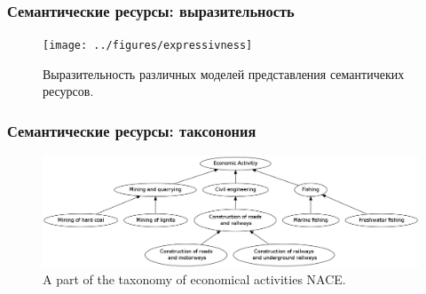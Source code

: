 
\begin{frame}
\frametitle{Семантические ресурсы: выразительность}

\begin{figure}
\centering
\texttt{[image: ../figures/expressivness]}
\caption{ Выразительность различных моделей представления семантичеких ресурсов. }
\label{fig:expressiveness}
\end{figure}

\end{frame}





\begin{frame}
\frametitle{Семантические ресурсы: таксонония }

\begin{figure}
\centering
\includegraphics[width=1.0\textwidth]{../figures/taxonomy-new}
\caption{ A part of the taxonomy of economical activities NACE.}
\label{fig:taxonomy}
\end{figure}

\end{frame}





